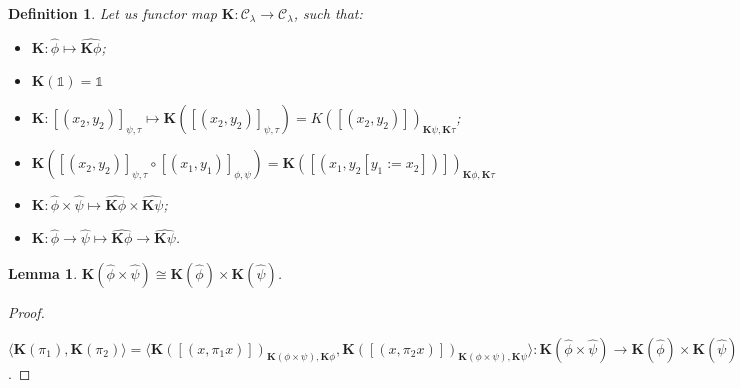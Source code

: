 \documentclass[a4paper]{article}
\newtheorem{lemma}{Lemma}
\newtheorem{defin}{Definition}
\begin{document}
\begin{defin} Let us functor map $\textbf{K} : \mathcal{C}_{\lambda} \to \mathcal{C}_{\lambda}$, such that:
\begin{itemize}
\item $\textbf{K} : \hat{\phi} \mapsto \hat{\textbf{K}\phi}$;
\item $\textbf{K}(\mathds{1}) = \mathds{1}$
\item $\textbf{K} : [(x_2, y_2)]_{\psi, \tau} \mapsto \textbf{K}([(x_2, y_2)]_{\psi, \tau}) = {K}([(x_2,
y_2)])_{\textbf{K}\psi, \textbf{K}\tau}$;
\item $\textbf{K}([(x_2, y_2)]_{\psi, \tau} \circ [(x_1, y_1)]_{\phi, \psi}) = \textbf{K}([(x_1, y_2[y_1 :=
x_2])])_{\textbf{K}\phi, \textbf{K}\tau}$
\item $\textbf{K} : \hat{\phi} \times \hat{\psi} \mapsto \hat{\textbf{K}\phi} \times \hat{\textbf{K}\psi}$;
\item $\textbf{K} : \hat{\phi} \rightarrow \hat{\psi} \mapsto \hat{\textbf{K}\phi} \rightarrow
\hat{\textbf{K}\psi}$.
\end{itemize}
\end{defin}

\begin{lemma}

$\textbf{K}(\hat{\phi} \times \hat{\psi}) \cong \textbf{K}(\hat{\phi}) \times \textbf{K}(\hat{\psi})$.

\end{lemma}

\begin{proof}

$ $

$\langle \textbf{K}(\pi_1), \textbf{K}(\pi_2) \rangle = \langle \textbf{K}([(x, \pi_1 x)])_{\textbf{K}(\phi \times \psi), \textbf{K}\phi}, \textbf{K}(
[(x, \pi_2 x)])_{\textbf{K}(\phi \times \psi), \textbf{K}\psi} \rangle : \textbf{K}(\hat{\phi} \times
\hat{\psi}) \rightarrow \textbf{K}(\hat{\phi}) \times \textbf{K}(\hat{\psi})$.
\end{proof}
\end{document}
